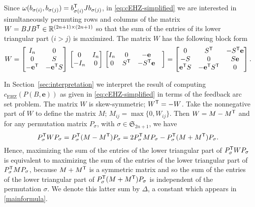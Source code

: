 \documentclass{amsart}
\newcommand{\cEHZ}{c_{\mathrm{EHZ}}}
\newcommand{\permS}{\mathfrak{S}}
\begin{document}
Since  $\omega(b_{\sigma(i)}, b_{\sigma(j)}) = b_{\sigma(i)}^{\sf T} J b_{\sigma(j)}$, 
in \eqref{eq:cEHZ-simplified} we are interested in simultaneously
permuting rows and columns of the matrix
$W = B J B^{\sf T} \in \mathbb{R}^{(2n+1) \times (2n+1)}$ so that the
sum of the entries of its lower triangular part ($i > j$) is
maximized. The matrix $W$ has the following block form
\[
  W =
\begin{bmatrix}
    I_n & 0\\
    0 & S\\
   -\mathbf{e}^{\sf T} & -\mathbf{e}^{\sf T} S\\
  \end{bmatrix}
  \,
  \begin{bmatrix}
    0 & I_n\\
    -I_n & 0\\
  \end{bmatrix}
  \,
  \begin{bmatrix}
I_n & 0 &   -\mathbf{e} &\\
0 & S^{\sf T} & -S^{\sf T} \mathbf{e}
\end{bmatrix}  
  =
  \begin{bmatrix}
0 & S^{\sf T} & -S^{\sf T}\textbf{e} \\
-S & 0 & S\textbf{e} \\
\textbf{e}^{\sf T}S & -\textbf{e}^{\sf T}S^{\sf T} & 0 \\
  \end{bmatrix}.
\]

\smallskip

In Section~\ref{sec:interpretation} we interpret the result of computing
$\cEHZ(P(B,\mathbf{e}))$ as given in \eqref{eq:cEHZ-simplified} in
terms of the feedback arc set problem. 
The matrix $W$ is skew-symmetric; $W^{\sf T} = -W$. Take the nonnegative part of $W$ to
define the matrix $M$; $M_{ij} = \max\{0,W_{ij}\}$. Then $W = M -
M^{\sf T}$ and for any permutation matrix $P_{\sigma}$, with $\sigma
\in \permS_{2n+1}$, we have
\begin{equation}\label{eq:WtoM}
  P_{\sigma}^{\sf T} W P_{\sigma} =   P_{\sigma}^{\sf T} (M - M^{\sf
    T}) P_{\sigma} = 2  P_{\sigma}^{\sf T} M P_{\sigma} -
  P_{\sigma}^{\sf T} (M + M^{\sf T}) P_{\sigma}.
\end{equation}
Hence, maximizing the sum of the entries of the lower triangular part
of $P_{\sigma}^{\sf T} W P_{\sigma}$ is equivalent to maximizing the
sum of the entries of the lower triangular part of
$P_{\sigma}^{\sf T} M P_{\sigma}$, because $M + M^{\sf T}$ is a
symmetric matrix and so the sum of the entries of the lower triangular
part of $P_{\sigma}^{\sf T} (M + M^{\sf T}) P_{\sigma}$ is independent
of the permutation $\sigma$. We denote this latter sum by $\Delta$, a constant which 
appears in \eqref{mainformula}.
\end{document}
